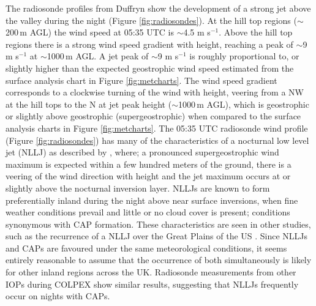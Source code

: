 \documentclass[times]{qjrms4}
\begin{document}
The radiosonde profiles from Duffryn show the development of a strong jet above the valley during the night (Figure \ref{fig:radiosondes}). At the hill top regions ($\sim$200$\,\mbox{m}$ AGL) the wind speed at 05:35 UTC is $\sim$4.5 m s$^{-1}$. Above the hill top regions there is a strong wind speed gradient with height, reaching a peak of $\sim$9 m s$^{-1}$ at $\sim$1000$\,\mbox{m}$ AGL. A jet peak of $\sim$9 m s$^{-1}$ is roughly proportional to, or slightly higher than the expected geostrophic wind speed estimated from the surface analysis chart in Figure \ref{fig:metcharts}. The wind speed gradient corresponds to a clockwise turning of the wind with height, veering from a NW at the hill tops to the N at jet peak height ($\sim$1000$\,\mbox{m}$ AGL), which is geostrophic or slightly above geostrophic (supergeostrophic) when compared to the surface analysis charts in Figure \ref{fig:metcharts}. The 05:35 UTC radiosonde wind profile (Figure \ref{fig:radiosondes}) has many of the characteristics of a nocturnal low level jet (NLLJ) as described by \citet{thorpe1977nocturnal}, where; a pronounced supergeostrophic wind maximum is expected within a few hundred meters of the ground, there is a veering of the wind direction with height and the jet maximum occurs at or slightly above the nocturnal inversion layer. NLLJs are known to form preferentially inland during the night above near surface inversions, when fine weather conditions prevail and little or no cloud cover is present; conditions synonymous with CAP formation. These characteristics are seen in other studies, such as the recurrence of a NLLJ over the Great Plains of the US \citep[p 168]{whiteman2000mountain}. Since NLLJs and CAPs are favoured under the same meteorological conditions, it seems entirely reasonable to assume that the occurrence of both simultaneously is likely for other inland regions across the UK. Radiosonde measurements from other IOPs during COLPEX show similar results, suggesting that NLLJs frequently occur on nights with CAPs.
\end{document}
